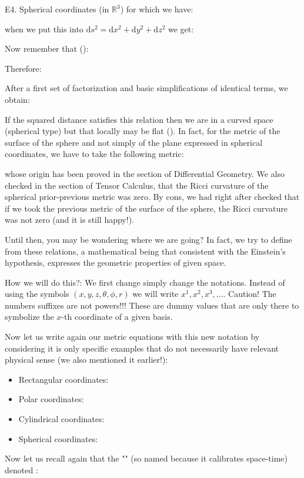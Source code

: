 	\pagebreak
	\begin{tcolorbox}[colframe=black,colback=white,sharp corners]	
	E4. Spherical coordinates (in $\mathbb{R}^3$) for which we have:
	
	when we put this into $\mathrm{d}s^2=\mathrm{d}x^2+\mathrm{d}y^2+\mathrm{d}z^2$ we get:
	
	Now remember that ():
	
	Therefore:
	
	After a first set of factorization and basic simplifications of identical terms, we obtain:
	
	If the squared  distance satisfies this relation then we are in a curved space (spherical type) but that locally may be flat (). In fact, for the metric of the surface of the sphere and not simply of the plane expressed in spherical coordinates, we have to take the following metric:
	
	whose origin has been proved in the section of Differential Geometry. We also checked in the section of Tensor Calculus, that the Ricci curvature of the spherical prior-previous metric was zero. By cons, we had right after checked that if we took the previous metric of the surface of the sphere, the Ricci curvature was not zero (and it is still happy!).
	\end{tcolorbox}
	Until then, you may be wondering where we are going? In fact, we try to define from these relations, a mathematical being that consistent with the Einstein's hypothesis, expresses the geometric properties of given space.
	
	How we will do this?: We first change simply change the notations. Instead of using the symbols $(x,y,z,\theta,\phi,r)$ we will write $x^1,x^2,x^3,...$. Caution! The numbers suffixes are not powers!!! These are dummy values that are only there to symbolize the $x$-th coordinate of a given basis.
	
	Now let us write again our metric equations with this new notation by considering it is only specific examples that do not necessarily have relevant physical sense (we also mentioned it earlier!):
	\begin{itemize}
		\item Rectangular coordinates:
		
		\item Polar coordinates:
		
		\item Cylindrical coordinates:
		
		\item Spherical coordinates:
		
	\end{itemize}
	Now let us recall again that the "\label{metric tensor}" (so named because it calibrates space-time) denoted :
	
